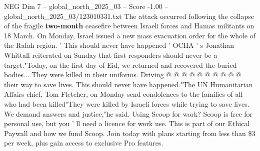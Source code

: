 \begin{textsample}{NEG Dim 7 – global\_north\_2025\_03 – Score -1.00 – global\_north\_2025\_03/123010331.txt}
The attack occurred following the collapse of the fragile \textbf{two-month} ceasefire between Israeli forces and Hamas militants on 18 March.
On Monday, Israel issued a new mass evacuation order for the whole of the Rafah region. ' This should never have happened ' OCHA ' s Jonathan Whittall reiterated on Sunday that first responders should never be a target."Today, on the first day of Eid, we returned and recovered the buried bodies...
They were killed in their uniforms.
Driving @ @ @ @ @ @ @ @ @ @ their way to save lives.
This should never have happened."The UN Humanitarian Affairs chief, Tom Fletcher, on Monday send condolences to the families of all who had been killed"They were killed by Israeli forces while trying to save lives.
We demand answers and justice,"he said.
Using Scoop for work?
Scoop is free for personal use, but you ' ll need a licence for work use.
This is part of our Ethical Paywall and how we fund Scoop.
Join today with plans starting from less than \$3 per week, plus gain access to exclusive Pro features.

\end{textsample}
